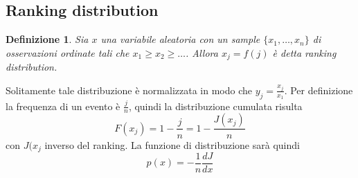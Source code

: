 \documentclass[12pt, a4paper]{book}
\theoremstyle{theorem}
\newtheorem{definition}{Definizione}[section]
\begin{document}
			\subsection{Ranking distribution}
				\begin{definition}
					Sia $x$ una variabile aleatoria con un sample $\{x_{1},\ldots,x_{n}\}$ di osservazioni ordinate tali che $x_{1}\geq x_{2}\geq\ldots$.
					Allora $x_{j}=f(j)$ è detta ranking distribution.
				\end{definition}
				Solitamente tale distribuzione è normalizzata in modo che $y_{j}=\frac{x_{j}}{x_{1}}$.
				Per definizione la frequenza di un evento è $\frac{j}{n}$, quindi la distribuzione cumulata risulta
				\begin{equation}
					F(x_{j})=1-\frac{j}{n}=1-\frac{J(x_{j})}{n}
				\end{equation}
				con $J(x_{j}$ inverso del ranking.
				La funzione di distribuzione sarà quindi
				\begin{equation}
					p(x)=-\frac{1}{n}\frac{dJ}{dx}
				\end{equation}
		
\end{document}
